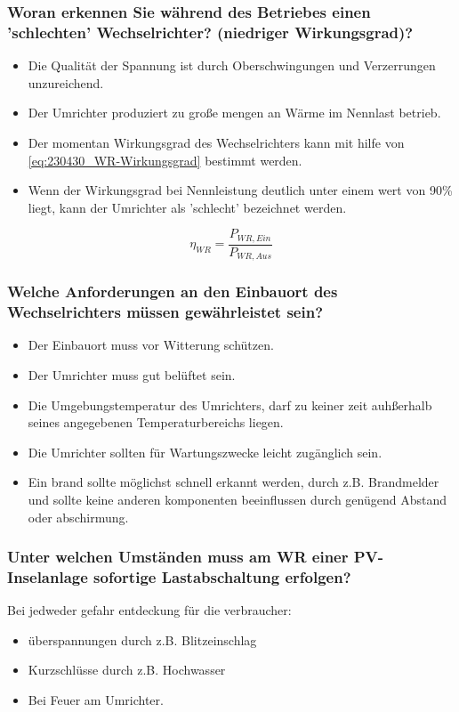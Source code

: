 \subsubsection{Woran erkennen Sie während des Betriebes einen 'schlechten' Wechselrichter? (niedriger Wirkungsgrad)?}

\begin{itemize}
    \item Die Qualität der Spannung ist durch Oberschwingungen und Verzerrungen unzureichend.
    \item Der Umrichter produziert zu große mengen an Wärme im Nennlast betrieb.
    \item Der momentan Wirkungsgrad des Wechselrichters kann mit hilfe von \autoref{eq:230430_WR-Wirkungsgrad} bestimmt werden.
    \item Wenn der Wirkungsgrad bei Nennleistung deutlich unter einem wert von 90\% liegt, kann der Umrichter als 'schlecht' bezeichnet werden.
\end{itemize}

\begin{equation}
    \eta_{WR} = \frac{P_{WR,Ein}}{P_{WR,Aus}}
    \label{eq:230430_WR-Wirkungsgrad}
\end{equation}

\subsubsection{Welche Anforderungen an den Einbauort des Wechselrichters müssen gewährleistet sein?}
\begin{itemize}
    \item Der Einbauort muss vor Witterung schützen.
    \item Der Umrichter muss gut belüftet sein.
    \item Die Umgebungstemperatur des Umrichters, darf zu keiner zeit auhßerhalb seines angegebenen Temperaturbereichs liegen.
    \item Die Umrichter sollten für Wartungszwecke leicht zugänglich sein.
    \item Ein brand sollte möglichst schnell erkannt werden, durch z.B. Brandmelder und sollte keine anderen komponenten beeinflussen durch genügend Abstand oder abschirmung.
\end{itemize}
\subsubsection{Unter welchen Umständen muss am WR einer PV-Inselanlage sofortige Lastabschaltung erfolgen?}
Bei jedweder gefahr entdeckung für die verbraucher:
\begin{itemize}
    \item überspannungen durch z.B. Blitzeinschlag
    \item Kurzschlüsse durch z.B. Hochwasser
    \item Bei Feuer am Umrichter.
\end{itemize}
